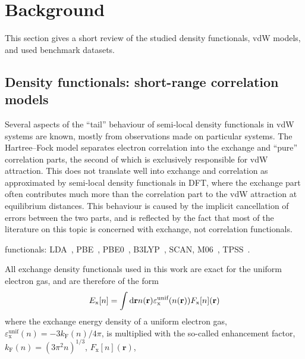 \section{Background}

This section gives a short review of the studied density functionals, vdW models, and used benchmark datasets.

\subsection{Density functionals: short-range correlation models}

Several aspects of the ``tail'' behaviour of semi-local density functionals in vdW systems are known, mostly from observations made on particular systems.
The Hartree--Fock model separates electron correlation into the exchange and ``pure'' correlation parts, the second of which is exclusively responsible for vdW attraction.
This does not translate well into exchange and correlation as approximated by semi-local density functionals in DFT, where the exchange part often contributes much more than the correlation part to the vdW attraction at equilibrium distances.
This behaviour is caused by the implicit cancellation of errors between the two parts, and is reflected by the fact that most of the literature on this topic is concerned with exchange, not correlation functionals.

functionals: LDA~\cite{DiracMPCPS30,PerdewPRB92}, PBE~\cite{PerdewPRL96}, PBE0~\cite{AdamoJCP99}, B3LYP~\cite{BeckeJCP93}, SCAN, M06~\cite{ZhaoTCA08}, TPSS~\cite{TaoPRL03}.

All exchange density functionals used in this work are exact for the uniform electron gas, and are therefore of the form
$$
E_\mathrm x[n]=\int\mathrm d\mathbf rn(\mathbf r)\varepsilon^\text{unif}_\text x(n(\mathbf r))F_\mathrm x[n](\mathbf r)
$$
where the exchange energy density of a uniform electron gas, $\varepsilon^\text{unif}_\mathrm x(n)=-3k_\mathrm F(n)/4\pi$, is multiplied with the so-called enhancement factor, $k_\mathrm F(n)=(3\pi^2n)^{1/3}$, $F_\mathrm x[n](\mathbf r)$,

